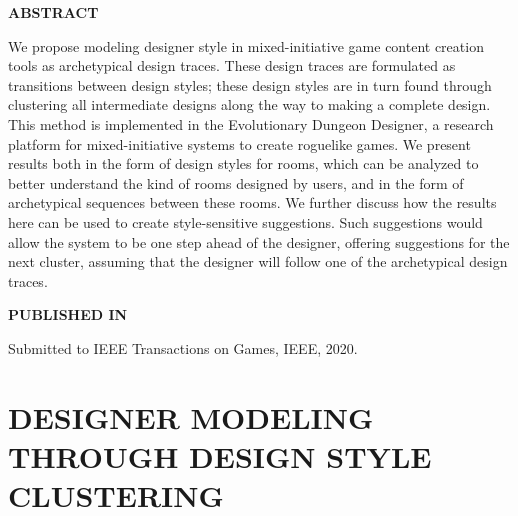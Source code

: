 \graphicspath{{included-papers-tex/paper-6/}}



\normalfont
\textbf{\textsc{ABSTRACT}}

We propose modeling designer style in mixed-initiative game content creation tools as archetypical design traces. These design traces are formulated as transitions between design styles; these design styles are in turn found through clustering all intermediate designs along the way to making a complete design. This method is implemented in the Evolutionary Dungeon Designer, a research platform for mixed-initiative systems to create roguelike games. We present results both in the form of design styles for rooms, which can be analyzed to better understand the kind of rooms designed by users, and in the form of archetypical sequences between these rooms. We further discuss how the results here can be used to create style-sensitive suggestions. Such suggestions would allow the system to be one step ahead of the designer, offering suggestions for the next cluster, assuming that the designer will follow one of the archetypical design traces.

\textbf{\textsc{PUBLISHED IN}}

Submitted to IEEE Transactions on Games, IEEE, 2020.

\section*{DESIGNER MODELING THROUGH DESIGN STYLE CLUSTERING}




% 

% 



